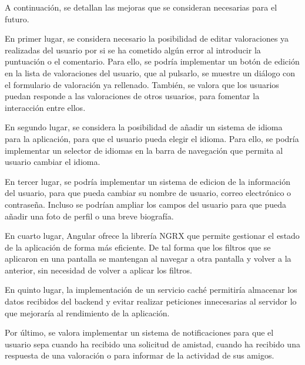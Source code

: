 A continuación, se detallan las mejoras que se consideran necesarias para el futuro.

En primer lugar, se considera necesario la posibilidad de editar valoraciones ya realizadas del usuario por 
si se ha cometido algún error al introducir la puntuación o el comentario. Para ello, se podría implementar un botón 
de edición en la lista de valoraciones del usuario, que al pulsarlo,
se muestre un diálogo con el formulario de valoración ya rellenado. También, se valora que los usuarios puedan 
responde a las valoraciones de otros usuarios, para fomentar la interacción entre ellos.

En segundo lugar, se considera la posibilidad de añadir un sistema de idioma para la aplicación, para que el usuario 
pueda elegir el idioma. Para ello, se podría implementar un selector de idiomas en la barra de navegación que permita al usuario
cambiar el idioma. 

En tercer lugar, se podría implementar un sistema de edicion de la información del usuario, para que pueda cambiar su nombre de usuario, correo electrónico
o contraseña. Incluso se podrían ampliar los campos del usuario para que pueda añadir una foto de perfil o una breve biografía. 

En cuarto lugar, Angular ofrece la librería NGRX \cite{ngrx} que permite gestionar el estado de la aplicación de forma más eficiente. De tal forma que 
los filtros que se aplicaron en una pantalla se mantengan al navegar a otra pantalla y volver a la anterior, sin necesidad de 
volver a aplicar los filtros.

En quinto lugar, la implementación de un servicio caché permitiría almacenar los datos recibidos del backend y evitar 
realizar peticiones innecesarias al servidor lo que mejoraría al rendimiento de la aplicación.

Por último, se valora implementar un sistema de notificaciones para que el usuario sepa cuando ha recibido una solicitud de amistad, 
cuando ha recibido una respuesta de una valoración o para informar de la actividad de sus amigos. 